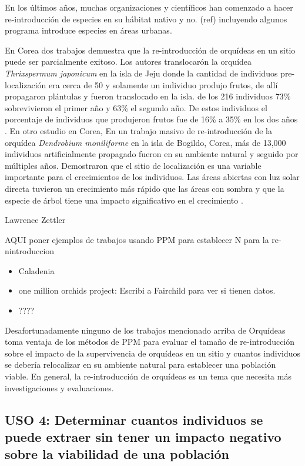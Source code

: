\documentclass[
]{book}
\theoremstyle{definition}
\theoremstyle{definition}
\theoremstyle{definition}
\theoremstyle{definition}
\theoremstyle{remark}
\begin{document}
En los últimos años, muchas organizaciones y científicos han comenzado a hacer re-introducción de especies en su hábitat nativo y no. (ref) incluyendo algunos programa introduce especies en áreas urbanas.

En Corea dos trabajos demuestra que la re-introducción de orquídeas en un sitio puede ser parcialmente exitoso. Los autores translocarón la orquídea \emph{Thrixspermum japonicum} en la isla de Jeju donde la cantidad de individuos pre-localización era cerca de 50 y solamente un individuo produjo frutos, de allí propagaron plántulas y fueron translocado en la isla. de los 216 individuos 73\% sobrevivieron el primer año y 63\% el segundo año. De estos individuos el porcentaje de individuos que produjeron frutos fue de 16\% a 35\% en los dos años \citep{kim2016restoration}. En otro estudio en Corea, En un trabajo masivo de re-introducción de la orquídea \emph{Dendrobium moniliforme} en la isla de Bogildo, Corea, más de 13,000 individuos artificialmente propagado fueron en su ambiente natural y seguido por múltiples años. Demostraron que el sitio de localización es una variable importante para el crecimientos de los individuos. Las áreas abiertas con luz solar directa tuvieron un crecimiento más rápido que las áreas con sombra y que la especie de árbol tiene una impacto significativo en el crecimiento \citep{kim2016restoration}.

Lawrence Zettler

AQUI poner ejemplos de trabajos usando PPM para establecer N para la re-nintroduccion

\begin{itemize}
\item
  Caladenia
\item
  one million orchids project: Escribi a Fairchild para ver si tienen datos.
\item
  ????
\end{itemize}

Desafortunadamente ninguno de los trabajos mencionado arriba de Orquídeas toma ventaja de los métodos de PPM para evaluar el tamaño de re-introducción sobre el impacto de la supervivencia de orquídeas en un sitio y cuantos individuos se debería relocalizar en su ambiente natural para establecer una población viable. En general, la re-introducción de orquídeas es un tema que necesita más investigaciones y evaluaciones.

\subsection{USO 4: Determinar cuantos individuos se puede extraer sin tener un impacto negativo sobre la viabilidad de una población}\label{uso-4-determinar-cuantos-individuos-se-puede-extraer-sin-tener-un-impacto-negativo-sobre-la-viabilidad-de-una-poblaciuxf3n}
\end{document}
